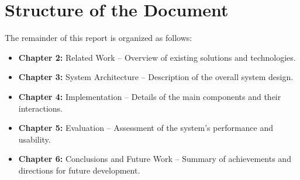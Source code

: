 %
%
\section{Structure of the Document} \label{sec15}
The remainder of this report is organized as follows:
\begin{itemize}
    \item \textbf{Chapter 2:} Related Work – Overview of existing solutions and technologies.
    \item \textbf{Chapter 3:} System Architecture – Description of the overall system design.
    \item \textbf{Chapter 4:} Implementation – Details of the main components and their interactions.
    \item \textbf{Chapter 5:} Evaluation – Assessment of the system's performance and usability.
    \item \textbf{Chapter 6:} Conclusions and Future Work – Summary of achievements and directions for future development.
\end{itemize}
